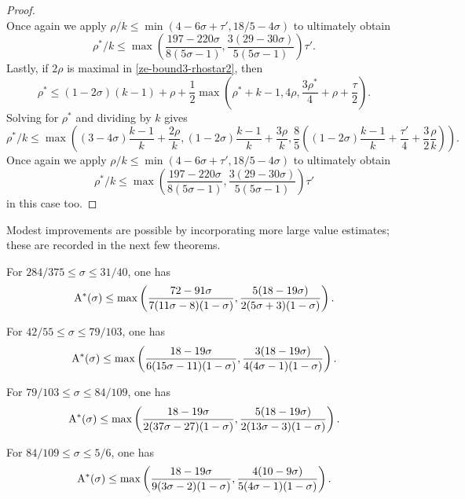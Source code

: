 \begin{proof}
\[\]
Once again we apply $\rho/k \le \min(4 - 6\sigma + \tau', 18/5 - 4\sigma)$ to ultimately obtain
\[
\rho^*/k \le \max\left(\frac{197 - 220\sigma}{8(5\sigma - 1)}, \frac{3(29 - 30\sigma)}{5(5\sigma - 1)}\right)\tau'.
\]
Lastly, if $2\rho$ is maximal in \eqref{ze-bound3-rhostar2}, then
\[
\rho^* \le (1 - 2\sigma)(k - 1) + \rho + \frac{1}{2}\max(\rho^*+k - 1, 4\rho, \frac{3\rho^*}{4} + \rho+\frac{\tau}{2}).
\]
Solving for $\rho^*$ and dividing by $k$ gives
\[
\rho^*/k \le \max((3 - 4\sigma)\frac{k - 1}{k} + \frac{2\rho}{k}, (1 - 2\sigma)\frac{k - 1}{k} + \frac{3\rho}{k}, \frac{8}{5}((1 - 2\sigma)\frac{k - 1}{k} + \frac{\tau'}{4} + \frac{3}{2}\frac{\rho}{k})).
\]
Once again we apply $\rho/k \le \min(4 - 6\sigma + \tau', 18/5 - 4\sigma)$ to ultimately obtain
\[
\rho^*/k \le \max\left(\frac{197 - 220\sigma}{8(5\sigma - 1)}, \frac{3(29 - 30\sigma)}{5(5\sigma - 1)}\right)\tau'
\]
in this case too.
\end{proof}

Modest improvements are possible by incorporating more large value estimates; these are recorded in the next few theorems.

\begin{theorem}\label{imp-energy-bound4}
For $284/375 \le \sigma \le 31/40$, one has
\[
\mathrm{A}^*(\sigma)\le \max\left(\frac{72 - 91\sigma}{7(11\sigma - 8)(1 - \sigma)}, \frac{5(18 - 19\sigma)}{2(5\sigma + 3)(1 - \sigma)}\right).
\]
\end{theorem}
\derived
{}

\begin{theorem}\label{imp-energy-bound6}
For $42/55 \le \sigma \le 79/103$, one has
\[
\mathrm{A}^*(\sigma) \le \max\left(\frac{18 - 19\sigma}{6(15\sigma - 11)(1- \sigma)}, \frac{3(18-19\sigma)}{4(4\sigma-1)(1 - \sigma)}\right).
\]
\end{theorem}
\derived
{}

\begin{theorem}\label{imp-energy-bound7}
For $79/103 \le \sigma \le 84/109$, one has
\[
\mathrm{A}^*(\sigma) \le \max\left(\frac{18 - 19\sigma}{2(37\sigma - 27)(1 - \sigma)}, \frac{5(18 - 19\sigma)}{2(13\sigma - 3)(1 - \sigma)}\right).
\]
\end{theorem}
\derived
{}

\begin{theorem}\label{imp-energy-bound8}
For $84/109 \le \sigma \le 5/6$, one has
\[
\mathrm{A}^*(\sigma) \le \max\left(\frac{18 - 19\sigma}{9(3\sigma - 2)(1 - \sigma)}, \frac{4(10 - 9\sigma)}{5(4\sigma - 1)(1 - \sigma)}\right).
\]
\end{theorem}
\derived
{}



